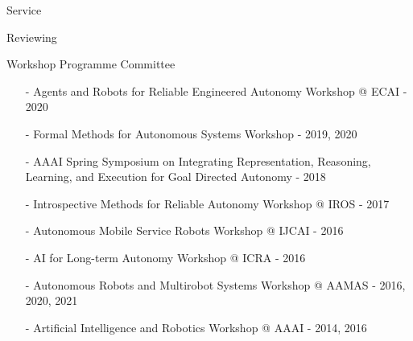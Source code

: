 \begin{rSection}{Service}
\begin{rSubsection}{Reviewing}{}{}{}
\item{Workshop Programme Committee}
\begin{itemize}
\vspace*{-0.2cm}
\item[-] Agents and Robots for Reliable Engineered Autonomy Workshop @ ECAI - 2020\vspace*{-0.2cm}
\item[-] Formal Methods for Autonomous Systems Workshop - 2019, 2020\vspace*{-0.2cm}
\item[-]  AAAI Spring Symposium on Integrating Representation, Reasoning, Learning, and Execution for Goal Directed Autonomy - 2018\vspace*{-0.2cm}
\item[-]  Introspective Methods for Reliable Autonomy Workshop @ IROS - 2017\vspace*{-0.2cm}
\item[-]  Autonomous Mobile Service Robots Workshop @ IJCAI - 2016\vspace*{-0.2cm}
\item[-]  AI for Long-term Autonomy Workshop @ ICRA - 2016\vspace*{-0.2cm}
\item[-]  Autonomous Robots and Multirobot Systems Workshop @ AAMAS - 2016, 2020, 2021\vspace*{-0.2cm}
\item[-] Artificial Intelligence and Robotics Workshop  @ AAAI - 2014, 2016
\end{itemize}
\end{rSubsection}





\end{rSection}
